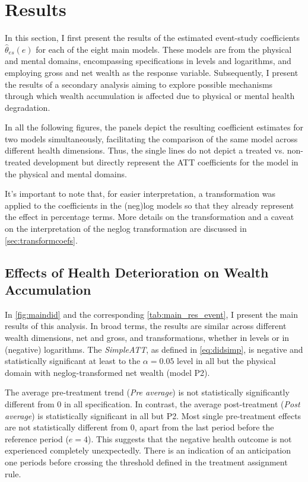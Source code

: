 \section{Results}
\label{sec:Results}

In this section, I first present the results of the estimated event-study coefficients $\hat{\theta}_{es}(e)$ for
each of the eight main models. These models are from the physical and mental domains, encompassing
specifications in levels and logarithms, and employing gross and net wealth as the response variable.
Subsequently, I present the results of a secondary analysis aiming to explore possible mechanisms through which
wealth accumulation is affected due to physical or mental health degradation.

In all the following figures, the panels depict the resulting coefficient estimates for two models
simultaneously, facilitating the comparison of the same model across different health dimensions. Thus, the
single lines do not depict a treated vs. non-treated development but directly represent the ATT coefficients for
the model in the physical and mental domains.

It's important to note that, for easier interpretation, a transformation was applied to the coefficients in the
(neg)log models so that they already represent the effect in percentage terms. More details on the
transformation and a caveat on the interpretation of the neglog transformation are discussed in
\cref{sec:transformcoefs}.




\subsection{Effects of Health Deterioration on Wealth Accumulation}
\label{sec:mainanalysiswealthaccum}

In \cref{fig:maindid} and the corresponding \cref{tab:main_res_event}, I present the main results of this
analysis. In broad terms, the results are similar across different wealth dimensions, net and gross, and
transformations, whether in levels or in (negative) logarithms. The \textit{SimpleATT}, as defined in
\cref{eq:didsimp}, is negative and statistically significant at least to the $\alpha=0.05$ level in all but
the physical domain with neglog-transformed net wealth (model P2).

The average pre-treatment trend (\textit{Pre average}) is not statistically significantly different from 0 in
all specification. In contrast, the average post-treatment (\textit{Post average}) is statistically significant
in all but P2. Most single pre-treatment effects are not statistically different from 0, apart from the last
period before the reference period ($e=4$). This suggests that the negative health outcome is not experienced
completely unexpectedly. There is an indication of an anticipation one periods before crossing the threshold
defined in the treatment assignment rule.

